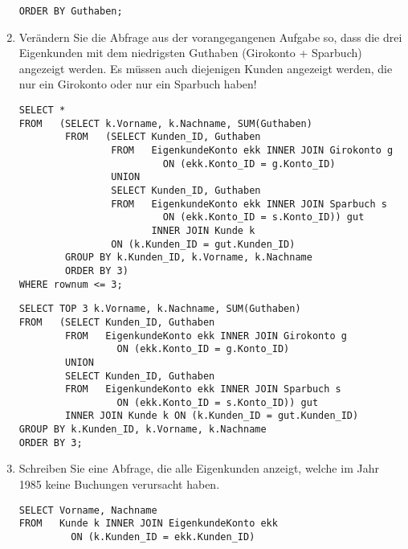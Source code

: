 \begin{enumerate}
\begin{lstlisting}[language=ms_sql]
ORDER BY Guthaben;
        \end{lstlisting}
        \clearpage
        \item Verändern Sie die Abfrage aus der vorangegangenen Aufgabe so,
        dass die drei Eigenkunden mit dem niedrigsten Guthaben (Girokonto +
        Sparbuch) angezeigt werden. Es müssen auch diejenigen Kunden angezeigt
        werden, die nur ein Girokonto oder nur ein Sparbuch haben!
        \begin{oraclesql}[\FALSE]
        \end{oraclesql}
        \begin{lstlisting}[language=oracle_sql]
SELECT *
FROM   (SELECT k.Vorname, k.Nachname, SUM(Guthaben)
        FROM   (SELECT Kunden_ID, Guthaben
                FROM   EigenkundeKonto ekk INNER JOIN Girokonto g
                         ON (ekk.Konto_ID = g.Konto_ID)
                UNION
                SELECT Kunden_ID, Guthaben
                FROM   EigenkundeKonto ekk INNER JOIN Sparbuch s
                         ON (ekk.Konto_ID = s.Konto_ID)) gut 
                       INNER JOIN Kunde k
                ON (k.Kunden_ID = gut.Kunden_ID)
        GROUP BY k.Kunden_ID, k.Vorname, k.Nachname
        ORDER BY 3)
WHERE rownum <= 3;
        \end{lstlisting}
        \begin{mssql}[\FALSE]
        \end{mssql}
        \begin{lstlisting}[language=ms_sql]
SELECT TOP 3 k.Vorname, k.Nachname, SUM(Guthaben)
FROM   (SELECT Kunden_ID, Guthaben
        FROM   EigenkundeKonto ekk INNER JOIN Girokonto g
                 ON (ekk.Konto_ID = g.Konto_ID)
        UNION
        SELECT Kunden_ID, Guthaben
        FROM   EigenkundeKonto ekk INNER JOIN Sparbuch s
                 ON (ekk.Konto_ID = s.Konto_ID)) gut
        INNER JOIN Kunde k ON (k.Kunden_ID = gut.Kunden_ID)
GROUP BY k.Kunden_ID, k.Vorname, k.Nachname
ORDER BY 3;
        \end{lstlisting}
\clearpage
        \item Schreiben Sie eine Abfrage, die alle Eigenkunden anzeigt, welche
        im Jahr 1985 keine Buchungen verursacht haben.
        \begin{oraclesql}[\FALSE]
        \end{oraclesql}
        \begin{lstlisting}[language=oracle_sql]
SELECT Vorname, Nachname
FROM   Kunde k INNER JOIN EigenkundeKonto ekk
         ON (k.Kunden_ID = ekk.Kunden_ID)

\end{lstlisting}
\end{enumerate}
